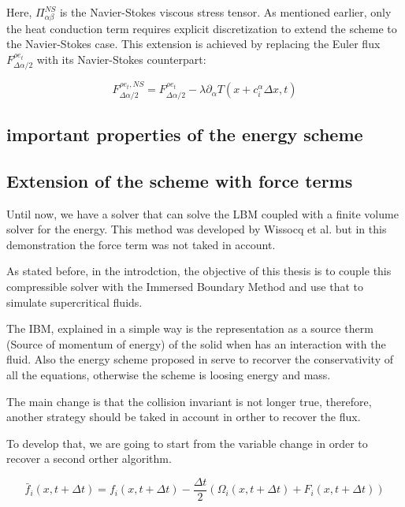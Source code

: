 Here, \( \Pi_{\alpha\beta}^{NS} \) is the Navier-Stokes viscous stress tensor.
As mentioned earlier, only the heat conduction term requires explicit
discretization to extend the scheme to the Navier-Stokes case. This extension is
achieved by replacing the Euler flux \( F_{\Delta\alpha/2}^{\rho e_t} \) with
its Navier-Stokes counterpart:

\begin{equation}
    F_{\Delta\alpha/2}^{\rho e_t, NS} = F_{\Delta\alpha/2}^{\rho e_t} - \lambda \partial_\alpha T(x + c_i^\alpha \Delta x, t)
\end{equation}


\subsection{important properties of the energy scheme}

\subsection{Extension of the scheme with force terms}
Until now, we have a solver that can solve the LBM coupled with a finite volume
solver for the energy. This method was developed by Wissocq et al.
\cite{wissocq2022restoring} but in this demonstration the force term was not
taked in account. 

As stated before, in the introdction, the objective of this thesis is to couple
this compressible solver with the Immersed Boundary Method and use that to
simulate supercritical fluids. 

The IBM, explained in a simple way is the representation as a source therm
(Source of momentum of energy) of the solid when has an interaction with the
fluid. Also the energy scheme proposed in \cite{wissocq2022restoring} serve to
recorver the conservativity of all the equations, otherwise the scheme is
loosing energy and mass.

The main change is that the collision invariant is not longer true, therefore,
another strategy should be taked in account in orther to recover the flux.

To develop that, we are going to start from the variable change in order to
recover a second orther algorithm.

\begin{equation}
	\bar{f}_i(x,t+\Delta t) = {f}_i(x,t+\Delta t) - \frac{\Delta t}{2}\left(\Omega_i(x,t+\Delta t) + F_i(x,t+\Delta t)\right) 
\end{equation}

